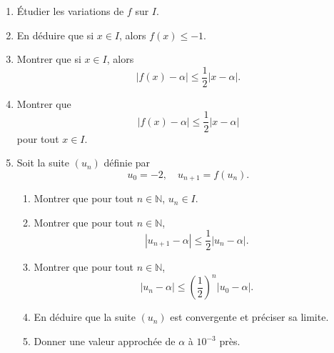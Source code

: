 \documentclass[12pt,a4paper]{article}
\begin{document}
\begin{enumerate}
    \item Étudier les variations de \( f \) sur \( I \).
    \item En déduire que si \( x \in I \), alors \( f(x) \leq -1 \).
    \item Montrer que si \( x \in I \), alors  
    \[
    |f(x) - \alpha| \leq \frac{1}{2} |x - \alpha|.
    \]
    \item Montrer que  
    \[
    |f(x) - \alpha| \leq \frac{1}{2} |x - \alpha|
    \]
    pour tout \( x \in I \).
    \item Soit la suite \( (u_n) \) définie par  
    \[
    u_0 = -2, \quad u_{n+1} = f(u_n).
    \]
    \begin{enumerate}
        \item Montrer que pour tout \( n \in \mathbb{N} \), \( u_n \in I \).
        \item Montrer que pour tout \( n \in \mathbb{N} \),
        \[
        |u_{n+1} - \alpha| \leq \frac{1}{2} |u_n - \alpha|.
        \]
        \item Montrer que pour tout \( n \in \mathbb{N} \),
        \[
        |u_n - \alpha| \leq \left( \frac{1}{2} \right)^n |u_0 - \alpha|.
        \]
        \item En déduire que la suite \( (u_n) \) est convergente et préciser sa limite.
        \item Donner une valeur approchée de \( \alpha \) à \( 10^{-3} \) près.
    \end{enumerate}
\end{enumerate}
\end{document}
